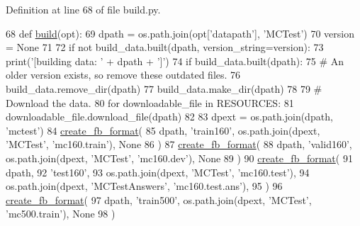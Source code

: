 Definition at line 68 of file build.\+py.


\begin{DoxyCode}
68 \textcolor{keyword}{def }\hyperlink{namespacedialog__babi__feedback_1_1build_a7a9d289f7493a5ded13c4b7f071b6184}{build}(opt):
69     dpath = os.path.join(opt[\textcolor{stringliteral}{'datapath'}], \textcolor{stringliteral}{'MCTest'})
70     version = \textcolor{keywordtype}{None}
71 
72     \textcolor{keywordflow}{if} \textcolor{keywordflow}{not} build\_data.built(dpath, version\_string=version):
73         print(\textcolor{stringliteral}{'[building data: '} + dpath + \textcolor{stringliteral}{']'})
74         \textcolor{keywordflow}{if} build\_data.built(dpath):
75             \textcolor{comment}{# An older version exists, so remove these outdated files.}
76             build\_data.remove\_dir(dpath)
77         build\_data.make\_dir(dpath)
78 
79         \textcolor{comment}{# Download the data.}
80         \textcolor{keywordflow}{for} downloadable\_file \textcolor{keywordflow}{in} RESOURCES:
81             downloadable\_file.download\_file(dpath)
82 
83         dpext = os.path.join(dpath, \textcolor{stringliteral}{'mctest'})
84         \hyperlink{namespaceparlai_1_1tasks_1_1wikiqa_1_1build_a554828702769592403db58c955d1dfe3}{create\_fb\_format}(
85             dpath, \textcolor{stringliteral}{'train160'}, os.path.join(dpext, \textcolor{stringliteral}{'MCTest'}, \textcolor{stringliteral}{'mc160.train'}), \textcolor{keywordtype}{None}
86         )
87         \hyperlink{namespaceparlai_1_1tasks_1_1wikiqa_1_1build_a554828702769592403db58c955d1dfe3}{create\_fb\_format}(
88             dpath, \textcolor{stringliteral}{'valid160'}, os.path.join(dpext, \textcolor{stringliteral}{'MCTest'}, \textcolor{stringliteral}{'mc160.dev'}), \textcolor{keywordtype}{None}
89         )
90         \hyperlink{namespaceparlai_1_1tasks_1_1wikiqa_1_1build_a554828702769592403db58c955d1dfe3}{create\_fb\_format}(
91             dpath,
92             \textcolor{stringliteral}{'test160'},
93             os.path.join(dpext, \textcolor{stringliteral}{'MCTest'}, \textcolor{stringliteral}{'mc160.test'}),
94             os.path.join(dpext, \textcolor{stringliteral}{'MCTestAnswers'}, \textcolor{stringliteral}{'mc160.test.ans'}),
95         )
96         \hyperlink{namespaceparlai_1_1tasks_1_1wikiqa_1_1build_a554828702769592403db58c955d1dfe3}{create\_fb\_format}(
97             dpath, \textcolor{stringliteral}{'train500'}, os.path.join(dpext, \textcolor{stringliteral}{'MCTest'}, \textcolor{stringliteral}{'mc500.train'}), \textcolor{keywordtype}{None}
98         )

\end{DoxyCode}
